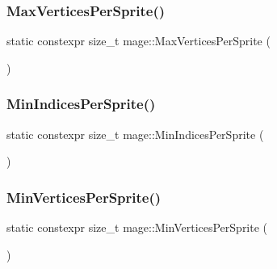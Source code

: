 \hypertarget{namespacemage_ab7053197804193820c19712e1f35201f}{}\label{namespacemage_ab7053197804193820c19712e1f35201f} 
\subsubsection{\texorpdfstring{Max\+Vertices\+Per\+Sprite()}{MaxVerticesPerSprite()}}
{\footnotesize\ttfamily static constexpr size\+\_\+t mage\+::\+Max\+Vertices\+Per\+Sprite (\begin{DoxyParamCaption}{ }\end{DoxyParamCaption})\hspace{0.3cm}{\ttfamily [static]}}

\hypertarget{namespacemage_a7bf923eb07c1afb9e517fd5955aada32}{}\label{namespacemage_a7bf923eb07c1afb9e517fd5955aada32} 
\subsubsection{\texorpdfstring{Min\+Indices\+Per\+Sprite()}{MinIndicesPerSprite()}}
{\footnotesize\ttfamily static constexpr size\+\_\+t mage\+::\+Min\+Indices\+Per\+Sprite (\begin{DoxyParamCaption}{ }\end{DoxyParamCaption})\hspace{0.3cm}{\ttfamily [static]}}

\hypertarget{namespacemage_afed1edb5e3a2ab2a2cd13ea06c72afc0}{}\label{namespacemage_afed1edb5e3a2ab2a2cd13ea06c72afc0} 
\subsubsection{\texorpdfstring{Min\+Vertices\+Per\+Sprite()}{MinVerticesPerSprite()}}
{\footnotesize\ttfamily static constexpr size\+\_\+t mage\+::\+Min\+Vertices\+Per\+Sprite (\begin{DoxyParamCaption}{ }\end{DoxyParamCaption})\hspace{0.3cm}{\ttfamily [static]}}

\hypertarget{namespacemage_afe0cda2eaeef24c7e3ee5d7a739b81e4}{}\label{namespacemage_afe0cda2eaeef24c7e3ee5d7a739b81e4} 
